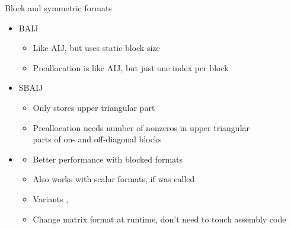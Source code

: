 \begin{frame}{Block and symmetric formats}
  \begin{itemize}
  \item BAIJ
    \begin{itemize}
    \item Like AIJ, but uses static block size
    \item Preallocation is like AIJ, but just one index per block
    \end{itemize}
  \item SBAIJ
    \begin{itemize}
    \item Only stores upper triangular part
    \item Preallocation needs number of nonzeros in upper triangular \\
      parts of on- and off-diagonal blocks
    \end{itemize}
  \item {}
    \begin{itemize}
    \item Better performance with blocked formats
    \item Also works with scalar formats, if  was called
    \item Variants , 
    \item Change matrix format at runtime, don't need to touch assembly code
    \end{itemize}
  \end{itemize}
\end{frame}
